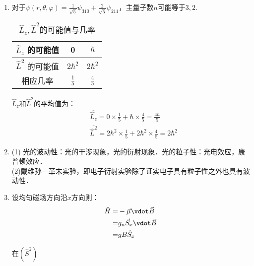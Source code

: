 
\begin{issues}
\issueTODO
\issueDraft
\end{issues}

\subsection{ }
\begin{enumerate}
\item 对于$\psi(r,\theta,\varphi) = \frac{1}{\sqrt{5}}\psi_{310} + \frac{2}{\sqrt{5}}\psi_{211} $，主量子数$n$可能等于$3,2$.\\
\begin{table}[ht]
\centering
\caption{$\hat{L}_{z},\hat{L}^{2}$的可能值与几率}\label{TJU14A_tab1}
\begin{tabular}{|c|c|c|}
\hline
$\hat{L}_z$ 的可能值 & 0 & $\hbar$  \\
\hline
$\hat{L}^2$ 的可能值 & $2\hbar^{2}$ & $2\hbar^{2}$  \\
\hline
相应几率 & $\frac{1}{5}$ & $\frac{4}{5}$  \\
\hline
\end{tabular}
\end{table}
$\hat{L}_{z}$和$\hat{L}^{2}$的平均值为：\\
\begin{align}
& \overline{\hat{L}_{z}} = 0 \times \frac{1}{5} + \hbar \times \frac{4}{5} = \frac{4\hbar}{5} \\
& \overline{\hat{L}^{2}} = 2\hbar^{2} \times \frac{1}{5} + 2\hbar^{2} \times \frac{4}{5} = 2\hbar^{2}
\end{align}
\item (1) 光的波动性：光的干涉现象，光的衍射现象．光的粒子性：光电效应，康普顿效应．\\
(2)戴维孙—革末实验，即电子衍射实验除了证实电子具有粒子性之外也具有波动性．
\item 设均匀磁场方向沿$x$方向则：
\begin{equation}
\begin{aligned}
\hat{H}=& -\vec{\mu}\vdot \vec{B} \\
=& g_{n}\vec{S}_{x}\vdot \vec{B} \\
=& gB\hat{S}_{x}
\end{aligned}
\end{equation}

在$(\hat{S}^{2})$
\end{enumerate}